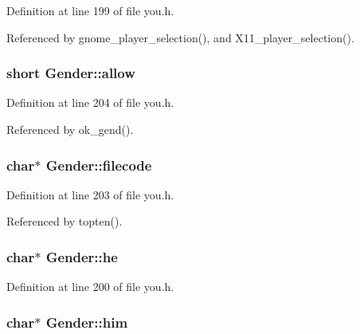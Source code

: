 Definition at line 199 of file you.\+h.



Referenced by gnome\+\_\+player\+\_\+selection(), and X11\+\_\+player\+\_\+selection().

\hypertarget{structGender_a2f19e03e12a099f1a27af9e2965d1cca}{
\subsubsection[{allow}]{\setlength{\rightskip}{0pt plus 5cm}short Gender\+::allow}}\label{structGender_a2f19e03e12a099f1a27af9e2965d1cca}


Definition at line 204 of file you.\+h.



Referenced by ok\+\_\+gend().

\hypertarget{structGender_ad52dd3790c3551d8c3f4c169e8cb9f75}{
\subsubsection[{filecode}]{ char$\ast$ Gender\+::filecode}}\label{structGender_ad52dd3790c3551d8c3f4c169e8cb9f75}


Definition at line 203 of file you.\+h.



Referenced by topten().

\hypertarget{structGender_a08a24c1dee5ae7dc45213067ef452df3}{
\subsubsection[{he}]{ char$\ast$ Gender\+::he}}\label{structGender_a08a24c1dee5ae7dc45213067ef452df3}


Definition at line 200 of file you.\+h.

\hypertarget{structGender_aedc348cd8e5f9b588f88bd2ada63e556}{
\subsubsection[{him}]{ char$\ast$ Gender\+::him}}\label{structGender_aedc348cd8e5f9b588f88bd2ada63e556}


